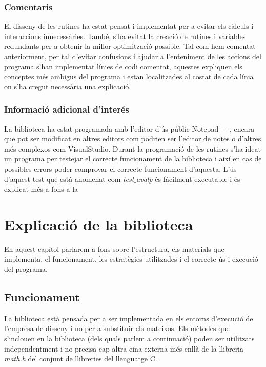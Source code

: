 \documentclass[12pt]{report}
\begin{document}
\subsection{Comentaris}
El disseny de les rutines ha estat pensat i implementat per a evitar els càlculs i interaccions innecessàries. També, s'ha evitat la creació de rutines i variables redundants per a obtenir la millor optimització possible.
\newline 
Tal com hem comentat anteriorment, per tal d'evitar confusions i ajudar a l'enteniment de les accions del programa s'han implementat línies de codi comentat, aquestes expliquen els conceptes més ambigus del programa i estan localitzades al costat de cada línia on s'ha cregut necessària una explicació.

\subsection{Informació adicional d'interés}
La biblioteca ha estat programada amb l'editor d'ús públic Notepad++, encara que pot ser modificat en altres editors com podrien ser l'editor de notes o d'altres més complexos com VisualStudio.
\newline
Durant la programació de les rutines s'ha ideat un programa per testejar el correcte funcionament de la biblioteca i així en cas de possibles errors poder comprovar el correcte funcionament d'aquesta.
\newline
L'ús d'aquest test que està anomenat com
\textit{test$\_$avalp} 
és fàcilment executable i és explicat més a fons a la 


\chapter{Explicació de la biblioteca}
En aquest capítol parlarem a fons sobre l'estructura, els materials que implementa, el funcionament, les estratègies utilitzades i el correcte ús i execució del programa.


\section{Funcionament}
La biblioteca està pensada per a ser implementada en els entorns d'execució de l'empresa de disseny i no per a substituir els mateixos.
\newline
Els mètodes que s'inclouen en la biblioteca (dels quals parlem a continuació) poden ser utilitzats independentment i no precisa cap altra eina externa més enllà de la llibreria \textit{math.h} del conjunt de llibreries del llenguatge C.
\end{document}

